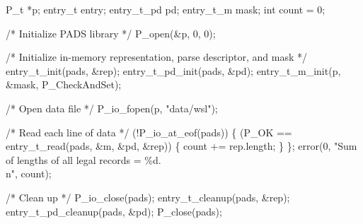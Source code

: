 \begin{centercode}
P\_t                  *p;
entry\_t              entry;
entry\_t\_pd           pd;
entry\_t\_m            mask;
int                  count = 0;   
   
/* Initialize PADS library */
P\_open(&p, 0, 0);

/* Initialize in-memory representation, parse descriptor, and mask */
entry_t_init(pads, &rep);
entry_t_pd_init(pads, &pd);
entry\_t\_m\_init(p, &mask, P\_CheckAndSet);

/* Open data file */
P\_io\_fopen(p, "data/wsl");

/* Read each line of data  */
 (!P\_io\_at\_eof(pads)) \{
     (P\_OK == entry\_t\_read(pads, &m, &pd, &rep)) \{
      count += rep.length; 
    \}
  \};
error(0, "Sum of lengths of all legal records = \%d.\\n", count);

/* Clean up */
P\_io\_close(pads);
entry\_t\_cleanup(pads, &rep);
entry\_t\_pd\_cleanup(pads, &pd);
P\_close(pads);
\end{centercode}
